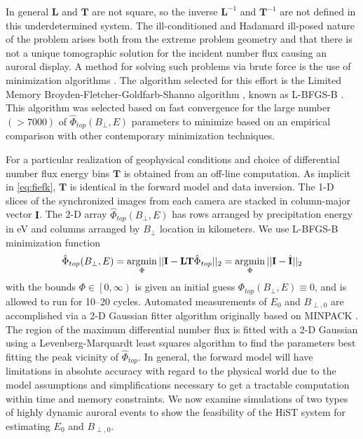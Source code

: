 In general $\mathbf{L}$ and $\mathbf{T}$ are not square, so the inverse $\mathbf{L}^{-1}$ and $\mathbf{T}^{-1}$ are not defined in this underdetermined system.
The ill-conditioned and Hadamard ill-posed nature of the problem arises both from the extreme problem geometry and that there is not a unique tomographic solution for the incident number flux causing an auroral display.
A method for solving such problems via brute force is the use of minimization algorithms \citep{semeter1997}. 
The algorithm selected for this effort is the Limited Memory Broyden-Fletcher-Goldfarb-Shanno algorithm \citep{Byrd1995,Zhu1997,Morales2011}, known as L-BFGS-B \citep{scipy}.
This algorithm was selected based on fast convergence for the large number $(>7000)$ of $\hat{\Phi}_{top}(B_\perp,E)$  parameters to minimize based on an empirical comparison with other contemporary minimization techniques.

For a particular realization of geophysical conditions and choice of differential number flux energy bins $\mathbf{T}$ is obtained from an off-line computation. 
As implicit in \eqref{eq:fiefk}, $\mathbf{T}$ is identical in the forward model and data inversion.
The 1-D slices of the synchronized images from each camera are stacked in column-major vector $\mathbf{I}$. 
The 2-D array $\hat{\Phi}_{top}(B_\perp,E)$ has rows arranged by precipitation energy in eV and columns arranged by $B_\perp$ location in kilometers.
We use L-BFGS-B minimization function
\begin{equation}\label{eq:bmin}
\hat{\Phi}_{top}(B_\perp,E) = \operatorname*{\arg\!\min}_\Phi||\mathbf{I}-\mathbf{LT}\hat{\Phi}_{top} ||_2 =  \operatorname*{\arg\!\min}_\Phi ||\mathbf{I}-\hat{\mathbf{I}}||_2
\end{equation}
with the bounds $\Phi \in \left[0,\infty\right)$ is given an initial guess $\Phi_{top}(B_\perp,E) \equiv 0$, and is allowed to run for 10--20 cycles. 
Automated measurements of $E_0$ and $B_{\perp,0}$ are accomplished via a 2-D Gaussian fitter algorithm originally based on MINPACK \citep{Minpack}. 
The region of the maximum differential number flux is fitted with a 2-D Gaussian using a Levenberg-Marquardt least squares algorithm to find the parameters best fitting the peak vicinity of $\hat{\Phi}_{top}$. 
In general, the forward model will have limitations in absolute accuracy with regard to the physical world due to the model assumptions and simplifications necessary to get a tractable computation within time and memory constraints.
We now examine simulations of two types of highly dynamic auroral events to show the feasibility of the HiST system for estimating $E_0$ and $B_{\perp,0}$.

%


